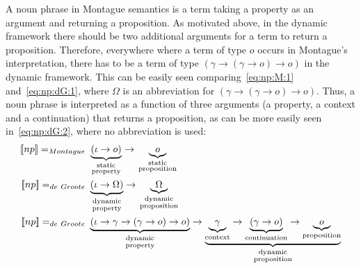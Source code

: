 A noun phrase in Montague semantics is a term taking a property as an argument and returning a proposition.  As motivated above, in the dynamic framework there should be two additional arguments for a term to return a proposition. Therefore, everywhere where a term of type $o$ occurs in Montague's interpretation, there has to be a term of type $(\gamma \rightarrow (\gamma \rightarrow o) \rightarrow o)$ in the dynamic framework. This can be easily seen comparing~\eqref{eq:np:M:1} and~\eqref{eq:np:dG:1}, where $\Omega$ is an abbreviation for $(\gamma \rightarrow (\gamma \rightarrow o) \rightarrow o)$. Thus, a noun phrase is interpreted as a function of three arguments (a property, a context and a continuation) that returns a proposition, as can be more easily seen in~\eqref{eq:np:dG:2}, where no abbreviation is used:
\begin{subequations}
\begin{align}
\I{np} =_{Montague} \ & \underbrace{(\iota \rightarrow   o)}_{
\begin{smallmatrix}
\text{static}\\
\text{property}
\end{smallmatrix}} \rightarrow \underbrace{o}_{\begin{smallmatrix}
\text{static}\\
\text{proposition}
\end{smallmatrix}} \label{eq:np:M:1} \\
\I{np} =_{de~Groote} \ & \underbrace{(\iota \rightarrow  \Omega )}_{\begin{smallmatrix}
\text{dynamic}\\
\text{property}
\end{smallmatrix}} \rightarrow \underbrace{\Omega}_{
\begin{smallmatrix}
\text{dynamic}\\
\text{proposition}
\end{smallmatrix}} \label{eq:np:dG:1} \\
\I{np} =_{de~Groote} \ & \underbrace{(\iota \rightarrow \gamma \rightarrow (\gamma \rightarrow o) \rightarrow o)}_{
\begin{smallmatrix}
\text{dynamic}\\
\text{property}
\end{smallmatrix}} \rightarrow \underbrace{\underbrace{\gamma}_{\text{context}} \rightarrow \underbrace{(\gamma \rightarrow o)}_{\text{continuation}} \rightarrow \underbrace{o}_{\text{proposition}}}_{\begin{smallmatrix}
\text{dynamic}\\
\text{proposition}
\end{smallmatrix}} \label{eq:np:dG:2}
\end{align}
\label{eq:np:MdG}
\end{subequations}

